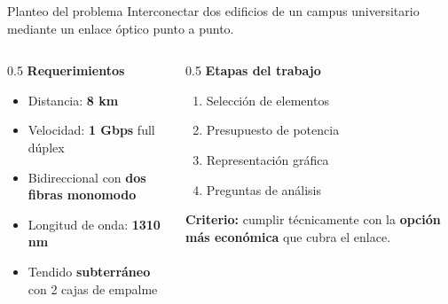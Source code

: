 \begin{frame}{Planteo del problema}
  Interconectar dos edificios de un campus universitario mediante un enlace óptico punto a punto.

  \vspace{0.3cm}
  \begin{columns}[T]
    \begin{column}{0.5\textwidth}
      \textbf{Requerimientos}
      \begin{itemize}
        \item Distancia: \textbf{8 km}
        \item Velocidad: \textbf{1 Gbps} full dúplex
        \item Bidireccional con \textbf{dos fibras monomodo}
        \item Longitud de onda: \textbf{1310 nm}
        \item Tendido \textbf{subterráneo} con 2 cajas de empalme
      \end{itemize}
    \end{column}
    \begin{column}{0.5\textwidth}
      \textbf{Etapas del trabajo}
      \begin{enumerate}
        \item[A.] Selección de elementos
        \item[B.] Presupuesto de potencia
        \item[C.] Representación gráfica
        \item[D.] Preguntas de análisis
      \end{enumerate}
      \vspace{0.2cm}
      \textbf{Criterio:} cumplir técnicamente con la \textbf{opción más económica} que cubra el enlace.
    \end{column}
  \end{columns}
\end{frame}

